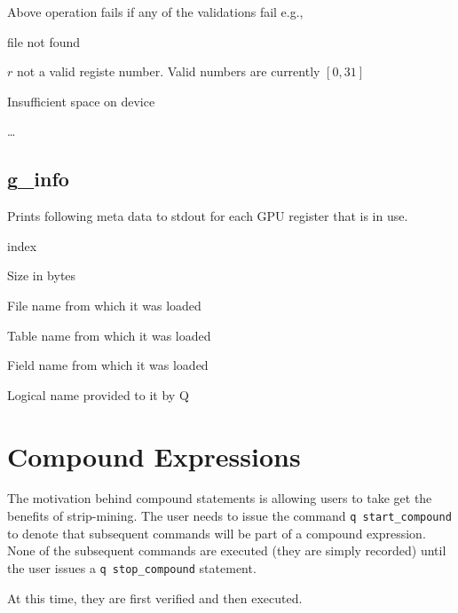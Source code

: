 Above operation fails if any of the validations fail e.g.,
\be
\item file not found
\item \(r\) not a valid registe number. Valid numbers are currently
\([0, 31]\)
\item Insufficient space on device
\item \ldots
\ee

\subsection{g\_info}
\label{g_info}

Prints following meta data to stdout for each GPU register that is in use.

\be
\item index
\item Size in bytes
\item File name from which it was loaded 
\item Table name from which it was loaded 
\item Field name from which it was loaded 
\item Logical name provided to it by Q 
\ee

\section{Compound Expressions}
\label{Compound}

The motivation behind compound statements is allowing users to take
get the benefits of strip-mining. The user needs to issue the command
{\tt q start\_compound} to denote that subsequent commands will be part of
a compound expression. None of the subsequent commands are executed
(they are simply recorded) until the user issues a {\tt q
  stop\_compound} statement.

At this time, they are first verified and then executed.

